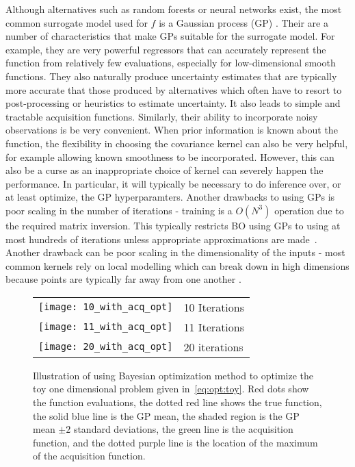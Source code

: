 Although alternatives such as random forests \citep{bergstra2011algorithms,hutter2011sequential} 
or neural networks \citep{snoek2015scalable} exist, the most common surrogate model used for 
$f$ is a Gaussian process (GP) \citep{rasmussen2006gaussian}.  Their are a number
of characteristics that make GPs suitable for the surrogate model.  For example, they are very powerful
regressors that can accurately represent the function from relatively few evaluations, especially
for low-dimensional smooth functions.  They also naturally produce uncertainty estimates
that are typically more accurate that those produced by alternatives  which often
have to resort to post-processing or heuristics to estimate uncertainty.
It also leads to simple and tractable acquisition functions.  Similarly, their ability to incorporate
noisy observations is be very convenient.  When prior information is known about the function, the
flexibility in choosing the covariance kernel can also be very helpful, for example allowing known
smoothness to be incorporated.  However, this can also be a curse as an inappropriate choice of
kernel can severely happen the performance.  In particular, it will typically be necessary to
do inference over, or at least optimize, the GP hyperparamters.  Another drawbacks to using GPs
is poor scaling in the number of iterations - training is a $O(N^3)$ operation due to the required
matrix inversion.  This typically restricts BO using GPs to using at most hundreds of iterations
unless appropriate approximations are made~\citep{snelson2006sparse,hensman2013gaussian}.
Another drawback can be poor scaling in the dimensionality of the inputs - most common kernels
rely on local modelling which can break down in high dimensions because points are typically
far away from one another \citep{bengio2006curse}.

\begin{figure}[t]
	\centering
	\begin{tabular}{m{} m{}}
	\texttt{[image: 10\_with\_acq\_opt]} & 10 Iterations
	\\
	\texttt{[image: 11\_with\_acq\_opt]} & 11 Iterations
	\\
	\texttt{[image: 20\_with\_acq\_opt]} & 20 iterations
	\end{tabular}
	\caption{Illustration of using Bayesian optimization method to optimize the
		toy one dimensional problem given in~\eqref{eq:opt:toy}.  Red dots show
		the function evaluations,  the dotted red line shows the true function, 
		the solid blue line is the GP mean, the shaded region is the GP mean $\pm 2$
		standard deviations, the green line is the acquisition function, and
		the dotted purple line is the location of the maximum of the acquisition
		function. \label{fig:opt:bayes-opt}}
\end{figure}

